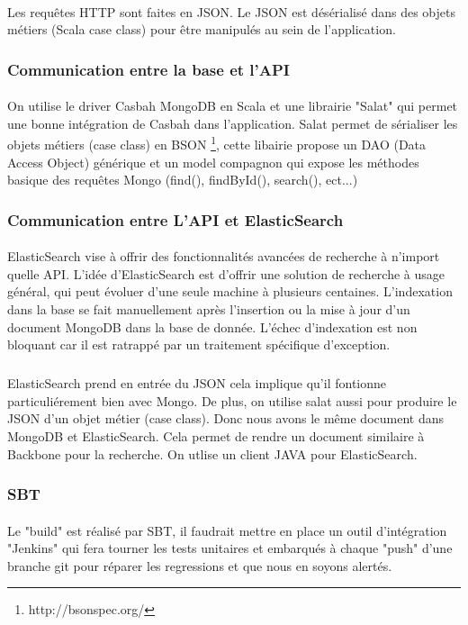 \paragraph{}
Les requêtes HTTP sont faites en JSON.
Le JSON est désérialisé dans des objets métiers 
(Scala case class) pour être manipulés au sein de l'application.
\subsubsection{Communication entre la base et l'API}
\paragraph{}
On utilise le driver Casbah MongoDB en Scala et une librairie "Salat" qui permet une bonne intégration de Casbah dans l'application.
Salat permet de sérialiser les objets métiers (case class) en BSON \footnote{http://bsonspec.org/}, cette libairie propose un DAO (Data Access Object) générique et un model compagnon qui expose les méthodes basique des requêtes Mongo (find(), findById(), search(), ect...)
\subsubsection{Communication entre L'API et ElasticSearch}
\paragraph{}
ElasticSearch vise à offrir des fonctionnalités avancées de recherche à n'import quelle API. L’idée d’ElasticSearch est d’offrir une solution de recherche à usage général, qui peut évoluer d’une seule machine à plusieurs centaines.  
L'indexation dans la base se fait manuellement après l'insertion ou la mise à jour d'un document MongoDB dans la base de donnée.
L'échec d'indexation est non bloquant car il est ratrappé par un traitement spécifique d'exception.
\subparagraph{}
ElasticSearch prend en entrée du JSON cela implique qu'il fontionne particuliérement bien avec Mongo.
De plus, on utilise salat aussi pour produire le JSON d'un objet métier (case class).
Donc nous avons le même document dans MongoDB et ElasticSearch. Cela permet de rendre un document similaire à Backbone pour la recherche.
On utlise un client JAVA pour ElasticSearch.
\subsubsection{SBT}
\paragraph{}
Le "build" est réalisé par SBT, il faudrait mettre en place un outil d'intégration "Jenkins" qui fera tourner les tests unitaires et embarqués à chaque "push" d'une branche git pour réparer les regressions et que nous en soyons alertés.
